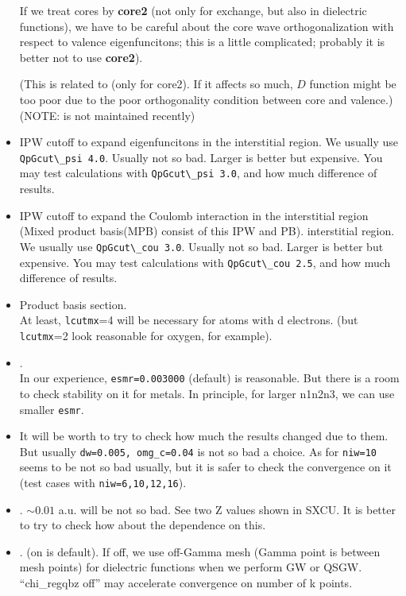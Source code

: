 \begin{itemize}
If we treat cores by {\bf core2} (not only for exchange, but also in
dielectric functions), we have to be careful about the core wave
orthogonalization with respect to valence eigenfuncitons; 
this is a little complicated; probably it is better
not to use {\bf core2}).

(This is related to  (only for core2).
If it affects so much, $D$ function might be too poor
due to the poor orthogonality condition 
between core and valence.) (NOTE:   is not maintained recently)

\item 
{} IPW cutoff to expand eigenfuncitons in the
      interstitial region. We usually use \verb#QpGcut\_psi 4.0#.
      Usually not so bad. Larger is better but expensive. You may test 
      calculations with \verb#QpGcut\_psi 3.0#, and how much difference
      of results.

\item 
{} IPW cutoff to expand the Coulomb interaction 
     in the interstitial region (Mixed product basis(MPB) consist of this IPW and PB).
      interstitial region. We usually use \verb#QpGcut\_cou 3.0#.
      Usually not so bad. Larger is better but expensive. You may test 
      calculations with \verb#QpGcut\_cou 2.5#, and how much difference
      of results.

\item
Product basis section.\\
At least, \verb#lcutmx#=4 will be necessary for atoms with d electrons.
(but \verb#lcutmx#=2 look reasonable for oxygen, for example).

\item
{}.\\
In our experience, \verb#esmr=0.003000# (default) is reasonable.
But there is a room to check stability on it for metals.
In principle, for larger n1n2n3, we can use smaller \verb#esmr#.

\item
{}

It will be worth to try to check
how much the results changed due to them.
But usually \verb#dw=0.005, omg_c=0.04# is not so bad a choice.
As for \verb#niw=10# seems to be not so bad usually, but
it is safer to check the convergence on it 
(test cases with \verb#niw=6,10,12,16#).

\item
{}.
$\sim 0.01$ a.u. will be not so bad. 
See two Z values shown in {\sf SXCU}. 
It is better to try to check how about the dependence on this.

\item
{}.
(on is default). If off, we use off-Gamma mesh (Gamma point is between
     mesh points) for dielectric functions when we perform GW or QSGW.
``chi\_regqbz off'' may accelerate convergence on number of k points.
\end{itemize}


